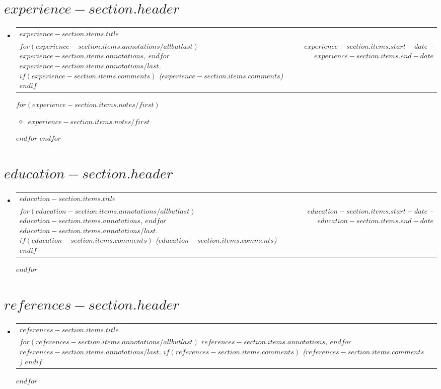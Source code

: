 \documentclass[letterpaper,11pt]{article}
\makeatletter
\newcommand{\resumeItem}[1]{
  \item\small{
    {#1 \vspace{-2pt}}
  }
}
\newcommand{\sectionItem}[3]{
    \item
    \begin{tabular*}{0.97\textwidth}{l@{\extracolsep{\fill}}r}
      \small\textbf{#1} \\ \textbar \footnotesize\emph{#2} & #3 \\
    \end{tabular*}\vspace{-7pt}
}
\newcommand{\resumeItemListStart}{\begin{itemize}}
\newcommand{\resumeItemListEnd}{\end{itemize}\vspace{-5pt}}
\newcommand{\sectionItemsListStart}{\begin{itemize}[leftmargin=0.15in, label={}]}
\newcommand{\sectionItemsListEnd}{\end{itemize}}
\makeatother
\begin{document}
  \section{$experience-section.header$}\label{$experience-section.label$}
  \sectionItemsListStart
  $for(experience-section.items)$
    \sectionItem
    {$experience-section.items.title$}
    {
      $for(experience-section.items.annotations/allbutlast)$
      $experience-section.items.annotations$, $endfor$
      $experience-section.items.annotations/last$.
      $if(experience-section.items.comments)$
      ($experience-section.items.comments$)
      $endif$
    }
    {
      $experience-section.items.start-date$ -- $experience-section.items.end-date$
    }
    $for(experience-section.items.notes/first)$
    \resumeItemListStart 
      \resumeItem{$experience-section.items.notes/first$}
    \resumeItemListEnd
    $endfor$
  $endfor$
  \sectionItemsListEnd
  
  \section{$education-section.header$}\label{$education-section.label$}
  \sectionItemsListStart
  $for(education-section.items)$
    \sectionItem
    {$education-section.items.title$}
    {
      $for(education-section.items.annotations/allbutlast)$
      $education-section.items.annotations$, $endfor$
      $education-section.items.annotations/last$.
      $if(education-section.items.comments)$
      ($education-section.items.comments$)
      $endif$
    }
    {
      $education-section.items.start-date$ -- $education-section.items.end-date$
    }
  $endfor$
  \sectionItemsListEnd

  \section{$references-section.header$}\label{$references-section.label$}
  \sectionItemsListStart
  $for(references-section.items)$
    \sectionItem
    {$references-section.items.title$}
    {
      $for(references-section.items.annotations/allbutlast)$
      $references-section.items.annotations$, $endfor$
      $references-section.items.annotations/last$.
      $if(references-section.items.comments)$
      ($references-section.items.comments$)
      $endif$
    }
    {}
  $endfor$
  \sectionItemsListEnd
\end{document}
